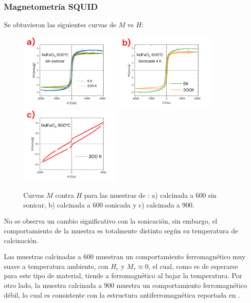 \documentclass[../main.tex]{subfiles}
\begin{document}
\subsubsection{Magnetometría SQUID}
Se obtuvieron las siguientes curvas de $M$ vs $H$:
\begin{figure}[H]
    \centering
    \includegraphics[width=0.45\textwidth]{fig/mvhNd.png}
    \quad
    \includegraphics[width=0.45\textwidth]{fig/mvhNd-S.png}
    \includegraphics[width=0.45\textwidth]{fig/mvhNd900.png}
    \caption{Curvas $M$ contra $H$ para las muestras de \neod{}: a) calcinada a 600\gradoC{} sin sonicar, b) calcinada a 600\gradoC{} sonicada y c) calcinada a 900\gradoC{}.}
    \label{fig:mvhNd}
\end{figure}
No se observa un cambio significativo con la sonicación, sin embargo, el comportamiento de la muestra es totalmente distinto según su temperatura de calcinación.

Las muestras calcinadas a 600\gradoC{} muestran un comportamiento ferromagnético muy suave a temperatura ambiente, con $H_c$ y $M_r\approx0$, el cual, como es de esperarse para este tipo de material, tiende a ferromagnético al bajar la temperatura. Por otro lado, la muestra calcinada a 900\gradoC{} muestra un comportamiento ferromagnético débil, lo cual es consistente con la estructura antiferromagnética reportada en \cite{Wang2019}.
\end{document}
